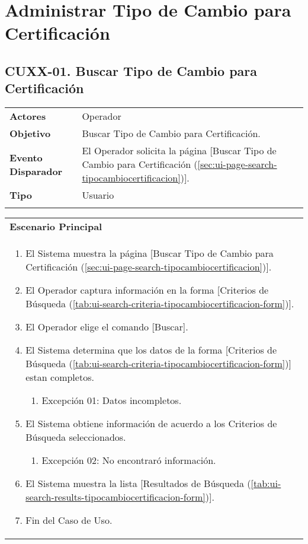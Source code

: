 \clearpage
\section{Administrar Tipo de Cambio para Certificación} \label{sec:cf-uc-admin-tipocambiocertificacion}

\subsection{CUXX-01. Buscar Tipo de Cambio para Certificación} \label{sec:cu-search-TipoCambioCertificacion}

\begin{tabular}{ p{3.5cm} p{11.5cm} }
	\textbf{Actores} & Operador\\
	\textbf{Objetivo} & Buscar Tipo de Cambio para Certificación.\\
	\textbf{Evento Disparador} & El Operador solicita la página [Buscar Tipo de Cambio para Certificación (\ref{sec:ui-page-search-tipocambiocertificacion})].\\
	\textbf{Tipo} & Usuario\\
	\\
\end{tabular}

\begin{tabular}{ p{15.5cm} }
	\textbf{Escenario Principal} \\
	\begin{enumerate}
		\item El Sistema muestra la página [Buscar Tipo de Cambio para Certificación (\ref{sec:ui-page-search-tipocambiocertificacion})].
		\item El Operador captura información en la forma [Criterios de Búsqueda (\ref{tab:ui-search-criteria-tipocambiocertificacion-form})].
		\item El Operador elige el comando [Buscar].
		\item El Sistema determina que los datos de la forma [Criterios de Búsqueda (\ref{tab:ui-search-criteria-tipocambiocertificacion-form})] estan completos.
			\begin{enumerate}
				\item Excepción 01: Datos incompletos.
			\end{enumerate}
		\item El Sistema obtiene información de acuerdo a los Criterios de Búsqueda seleccionados.
			\begin{enumerate}
				\item Excepción 02: No encontraró información.
			\end{enumerate}
		\item El Sistema muestra la lista [Resultados de Búsqueda (\ref{tab:ui-search-results-tipocambiocertificacion-form})].
		\item Fin del Caso de Uso.
	\end{enumerate}
\end{tabular}


